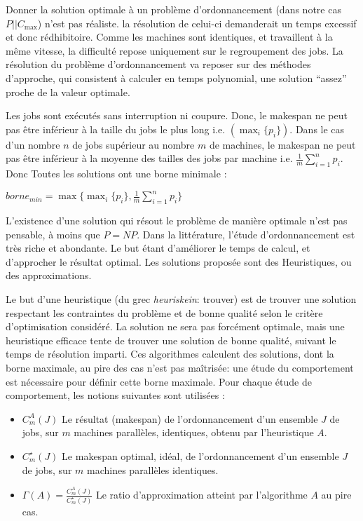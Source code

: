 \documentclass[a4paper,12pt]{report}
\theoremstyle{plain}				%
\theoremstyle{definition}				%
\newcommand\problemGrahamP{$P||C_{\max}$\xspace}
\begin{document}
Donner la solution optimale à un problème d'ordonnancement 
  (dans notre cas \problemGrahamP) n'est pas réaliste. 
  la résolution de celui-ci demanderait un temps excessif et donc rédhibitoire.
Comme les machines sont identiques, et travaillent à la même vitesse,
la difficulté repose uniquement sur le regroupement des jobs.
La résolution du problème d'ordonnancement va reposer sur des méthodes
  d'approche, qui consistent à calculer en temps polynomial,
  une solution ``assez'' proche de la valeur optimale.

Les jobs sont exécutés sans interruption ni coupure. Donc,
  le makespan ne  peut pas être inférieur à la taille du jobs
  le plus long i.e. $(\max_i\{p_i\})$.
  Dans le cas d'un nombre $n$ de jobs supérieur au nombre $m$ de machines,
  le makespan ne peut pas être inférieur à la moyenne
  des tailles des jobs par machine
  i.e. $\frac{1}{m} \sum_{i=1}^{n} p_i$.
Donc Toutes les solutions ont une borne minimale
  \cite{mcnaughton1959scheduling}: \\

  \begin{center}
  $borne_{min} = \max \{ \max_i\{p_i\}, \frac{1}{m} \sum_{i=1}^{n} p_i \}$
  \label{borneMini}
  \end{center}

L'existence d'une solution qui résout le problème de manière optimale
  n'est pas pensable, à moins que $P = NP$.
Dans la littérature, l'étude d'ordonnancement est très riche et abondante. 
Le but étant d'améliorer le temps de calcul, et d'approcher le résultat optimal. 
Les solutions proposée sont des Heuristiques, ou des approximations.

Le but d'une heuristique (du grec \emph{heuriskein}: trouver) est 
  de trouver une solution respectant les contraintes du problème et 
  de bonne qualité selon le critère d'optimisation considéré. 
  La solution ne sera pas forcément optimale, 
  mais une heuristique efficace tente de trouver une solution de bonne qualité, 
  suivant le temps de résolution imparti.
Ces algorithmes calculent des solutions, dont la borne maximale, 
  au pire des cas n'est pas maîtrisée: une étude du comportement est nécessaire 
  pour définir cette borne maximale.  
  Pour chaque étude de comportement, les notions suivantes sont utilisées :

\begin{itemize}
\item $C_m^A(J)$ Le résultat (makespan) de l'ordonnancement
	d'un ensemble $J$ de jobs,
	sur $m$ machines parallèles, identiques,
	obtenu par l'heuristique $A$.
\item $C_m^\star(J)$ Le makespan optimal, idéal, de l'ordonnancement
	d'un ensemble $J$ de jobs,
	sur $m$ machines parallèles identiques.
\item $\Gamma(A)=\frac{C_m^A(J)}{C_m^\star(J)}$
	Le ratio d'approximation atteint par l'algorithme $A$ au pire cas.
\end{itemize}
   
\end{document}

